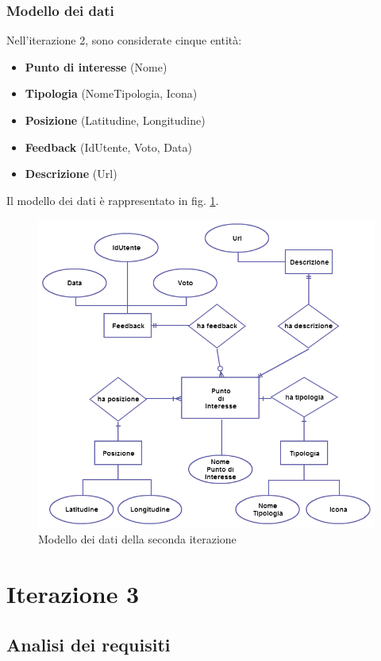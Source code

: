 \subsubsection{Modello dei dati}
Nell'iterazione 2, sono considerate cinque entità:
\begin{itemize}
\item \textbf{Punto di interesse} (Nome)
\item \textbf{Tipologia} (NomeTipologia, Icona)
\item \textbf{Posizione} (Latitudine, Longitudine)
\item \textbf{Feedback} (IdUtente, Voto, Data)
\item \textbf{Descrizione} (Url)
\end{itemize}
Il modello dei dati è rappresentato in fig. \ref{datamodelsecondaiterazione}.
\begin{figure}
\includegraphics[scale=0.55]{imgs/model/DataModelSecondaIterazione.png} 
\caption{Modello dei dati della seconda iterazione\label{datamodelsecondaiterazione}}
\end{figure}



\clearpage

\section{Iterazione 3}

\subsection{Analisi dei requisiti}
